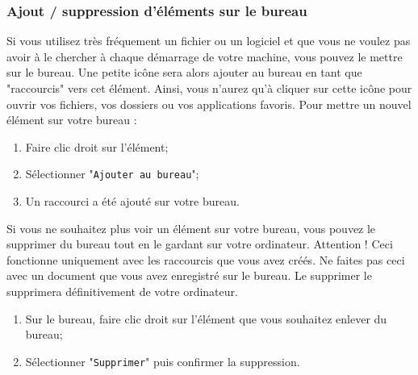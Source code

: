 \documentclass[12pt]{book}
\begin{document}
		\subsubsection{Ajout / suppression d'éléments sur le bureau}\label{sec:elementsbureau}
			Si vous utilisez très fréquement un fichier ou un logiciel et que vous ne voulez pas avoir à le chercher à chaque démarrage de votre machine, vous pouvez le mettre sur le bureau. Une petite icône sera alors ajouter au bureau en tant que "raccourcis" vers cet élément. 
			Ainsi, vous n'aurez qu'à cliquer sur cette icône pour ouvrir vos fichiers, vos dossiers ou vos applications favoris.\newline
			Pour mettre un nouvel élément sur votre bureau :
			\begin{enumerate}
				\item Faire clic droit sur l'élément;
				\item Sélectionner "\texttt{Ajouter au bureau}";
				\item Un raccourci a été ajouté sur votre bureau.
			\end{enumerate}\par
			Si vous ne souhaitez plus voir un élément sur votre bureau, vous pouvez le supprimer du bureau tout en le gardant sur votre ordinateur.\newline
			Attention !
			Ceci fonctionne uniquement avec les raccourcis que vous avez créés. Ne faites pas ceci avec un document que vous avez enregistré sur le bureau.
			Le supprimer le supprimera définitivement de votre ordinateur.
			\begin{enumerate}
				\item Sur le bureau, faire clic droit sur l'élément que vous souhaitez enlever du bureau;
				\item Sélectionner "\texttt{Supprimer}" puis confirmer la suppression.
			\end{enumerate}
\end{document}
